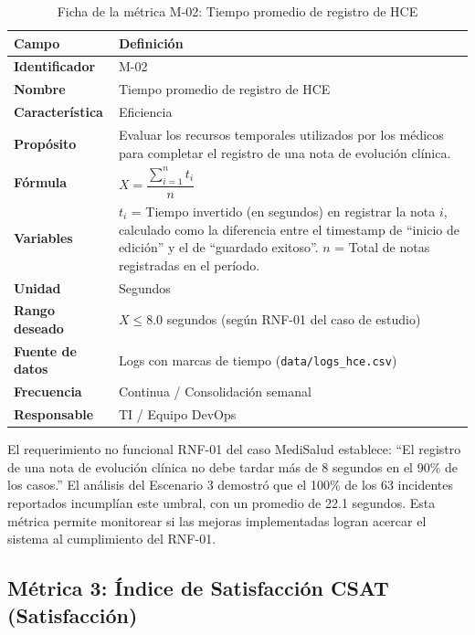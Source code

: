 \documentclass[12pt,a4paper]{article}
\begin{document}
\begin{table}[H]
\centering
\caption{Ficha de la m\'etrica M-02: Tiempo promedio de registro de HCE}
\begin{tabularx}{\textwidth}{l X}
\toprule
\textbf{Campo} & \textbf{Definici\'on} \\
\midrule
\textbf{Identificador} & M-02 \\
\textbf{Nombre} & Tiempo promedio de registro de HCE \\
\textbf{Caracter\'istica} & Eficiencia \\
\textbf{Prop\'osito} & Evaluar los recursos temporales utilizados por los m\'edicos para completar el registro de una nota de evoluci\'on cl\'inica. \\
\textbf{F\'ormula} & $X = \dfrac{\sum_{i=1}^{n} t_i}{n}$ \\
\textbf{Variables} & $t_i$ = Tiempo invertido (en segundos) en registrar la nota $i$, calculado como la diferencia entre el timestamp de ``inicio de edici\'on'' y el de ``guardado exitoso''. \newline $n$ = Total de notas registradas en el per\'iodo. \\
\textbf{Unidad} & Segundos \\
\textbf{Rango deseado} & $X \le 8.0$ segundos (seg\'un RNF-01 del caso de estudio) \\
\textbf{Fuente de datos} & Logs con marcas de tiempo (\texttt{data/logs\_hce.csv}) \\
\textbf{Frecuencia} & Continua / Consolidaci\'on semanal \\
\textbf{Responsable} & TI / Equipo DevOps \\
\bottomrule
\end{tabularx}
\end{table}

\begin{tcolorbox}[colback=blue!5, colframe=blue!50!black, title=Nota sobre RNF-01]
El requerimiento no funcional RNF-01 del caso MediSalud establece: ``El registro de una nota de evoluci\'on cl\'inica no debe tardar m\'as de 8 segundos en el 90\% de los casos.'' El an\'alisis del Escenario 3 demostr\'o que el 100\% de los 63 incidentes reportados incumpl\'ian este umbral, con un promedio de 22.1 segundos. Esta m\'etrica permite monitorear si las mejoras implementadas logran acercar el sistema al cumplimiento del RNF-01.
\end{tcolorbox}

\subsection{M\'etrica 3: \'Indice de Satisfacci\'on CSAT (Satisfacci\'on)}
\end{document}
